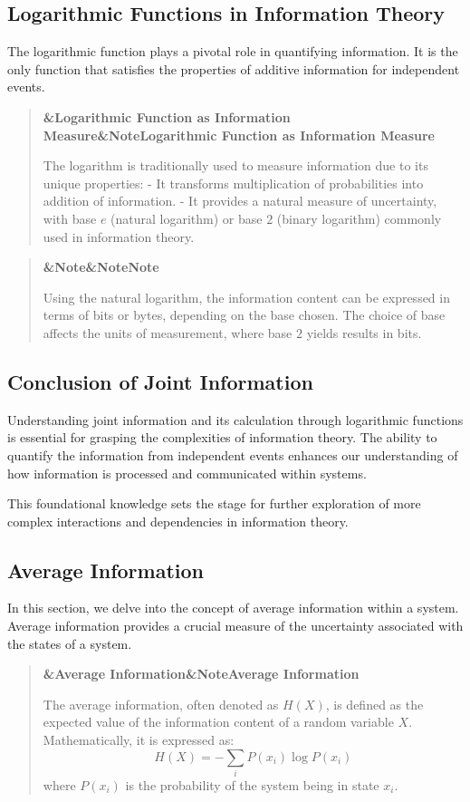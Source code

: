 \documentclass[a4paper]{article}
\newcommand{\boxheading}[1]{%
  \par\smallskip
  \noindent\textbf{\ifx&#1&Note\else#1\fi}\par
  \smallskip
}
\newenvironment{thmbox}[1][]{%
  \begin{quote}\color{blue!60!black}\boxheading{#1}\normalcolor
}{\end{quote}}
\newenvironment{defbox}[1][]{%
  \begin{quote}\color{green!40!black}\boxheading{#1}\normalcolor
}{\end{quote}}
\newenvironment{rembox}[1][]{%
  \begin{quote}\color{black!70}\boxheading{#1}\normalcolor
}{\end{quote}}
\begin{document}
\subsection{Logarithmic Functions in Information Theory}
The logarithmic function plays a pivotal role in quantifying information. It is the only function that satisfies the properties of additive information for independent events.

\begin{thmbox}[Logarithmic Function as Information Measure]
The logarithm is traditionally used to measure information due to its unique properties:
- It transforms multiplication of probabilities into addition of information.
- It provides a natural measure of uncertainty, with base \( e \) (natural logarithm) or base \( 2 \) (binary logarithm) commonly used in information theory.
\end{thmbox}

\begin{rembox}[Note]
Using the natural logarithm, the information content can be expressed in terms of bits or bytes, depending on the base chosen. The choice of base affects the units of measurement, where base \( 2 \) yields results in bits.
\end{rembox}

\subsection{Conclusion of Joint Information}
Understanding joint information and its calculation through logarithmic functions is essential for grasping the complexities of information theory. The ability to quantify the information from independent events enhances our understanding of how information is processed and communicated within systems. 

This foundational knowledge sets the stage for further exploration of more complex interactions and dependencies in information theory.

\subsection{Average Information}
In this section, we delve into the concept of average information within a system. Average information provides a crucial measure of the uncertainty associated with the states of a system. 

\begin{defbox}[Average Information]
The average information, often denoted as \( H(X) \), is defined as the expected value of the information content of a random variable \( X \). Mathematically, it is expressed as:
\[
H(X) = -\sum_{i} P(x_i) \log P(x_i)
\]
where \( P(x_i) \) is the probability of the system being in state \( x_i \).
\end{defbox}
\end{document}

